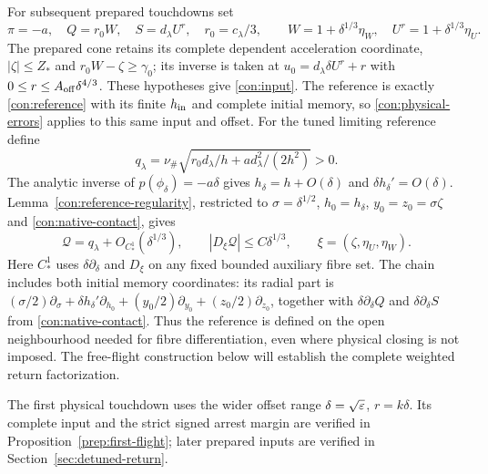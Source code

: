 For subsequent prepared touchdowns set
\begin{equation}
 \pi=-a,\quad Q=r_0W,\quad S=d_\lambda U^r,\quad
 r_0=c_\lambda/3,\qquad
 W=1+\delta^{1/3}\eta_W,\quad
 U^r=1+\delta^{1/3}\eta_U.
 \label{con:native-contact}
\end{equation}
The prepared cone retains its complete dependent acceleration
coordinate, $|\zeta|\le Z_*$ and $r_0W-\zeta\ge\gamma_0$;
its inverse is taken at $u_0=d_\lambda\delta U^r+r$ with
$0\le r\le A_{\rm off}\delta^{4/3}$.
These hypotheses give \eqref{con:input}.  The reference is exactly
\eqref{con:reference} with its finite $h_{\rm in}$ and complete
initial memory, so \eqref{con:physical-errors} applies to this same
input and offset.
For the tuned limiting reference define
\begin{equation}
 q_\lambda=\nu_\#
 \sqrt{r_0d_\lambda/h+ad_\lambda^2/(2h^2)}>0.
 \label{con:q-lambda}
\end{equation}
The analytic inverse of $p(\phi_\delta)=-a\delta$ gives
$h_\delta=h+O(\delta)$ and $\delta h_\delta'=O(\delta)$.
Lemma~\ref{con:reference-regularity}, restricted to
$\sigma=\delta^{1/2}$, $h_0=h_\delta$,
$y_0=z_0=\sigma\zeta$ and \eqref{con:native-contact}, gives
\begin{equation}
 \mathcal Q=q_\lambda+O_{C^1_*}(\delta^{1/3}),\qquad
 |D_\xi\mathcal Q|\le C\delta^{1/3},\qquad
 \xi=(\zeta,\eta_U,\eta_W).
 \label{con:weighted-contact}
\end{equation}
Here $C^1_*$ uses $\delta\partial_\delta$ and $D_\xi$ on any fixed
bounded auxiliary fibre set.  The chain includes both initial memory
coordinates: its radial part is
$(\sigma/2)\partial_\sigma+
\delta h_\delta'\partial_{h_0}+
(y_0/2)\partial_{y_0}+(z_0/2)\partial_{z_0}$, together with
$\delta\partial_\delta Q$ and $\delta\partial_\delta S$ from
\eqref{con:native-contact}.  Thus the reference is defined on the
open neighbourhood needed for fibre differentiation, even where
physical closing is not imposed.  The free-flight construction below
will establish the complete weighted return factorization.

The first physical touchdown uses the wider offset range
$\delta=\sqrt{\varepsilon}$, $r=k\delta$. Its complete input and the
strict signed arrest margin are verified in
Proposition~\ref{prep:first-flight}; later prepared inputs are
verified in Section~\ref{sec:detuned-return}.
